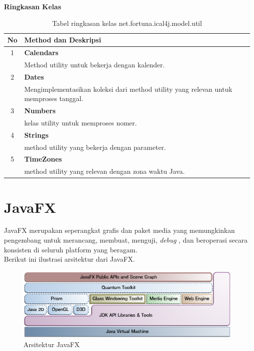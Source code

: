 	\noindent \textbf{Ringkasan Kelas}\cite{ical}
	\begin{table}[H]
		\centering
		\caption{Tabel ringkasan kelas net.fortuna.ical4j.model.util}
		\label{tab:kelas_net.fortuna.ical4j.model.util}
	\begin{tabular}{|c|p{12cm}|}
		\hline
		\textbf{No} & \textbf{Method dan Deskripsi} \\ \hline \hline
		1 & \textbf{Calendars}\\
			&	Method utility untuk bekerja dengan kalender.\\ \hline
		2 & \textbf{Dates}\\
			&	Mengimplementasikan koleksi dari method utility yang relevan untuk memproses tanggal. \\ \hline
		3 & \textbf{Numbers}\\
			&	kelas utility untuk memproses nomer. \\ \hline
		4 & \textbf{Strings}\\
			&	method utility yang bekerja dengan parameter. \\ \hline
		5 & \textbf{TimeZones}\\
			&	method utility yang relevan dengan zona waktu Java. \\ \hline
		\end{tabular}
\end{table}

\section{JavaFX}
\label{sec:JavaFX}
JavaFX merupakan seperangkat grafis dan paket media yang memungkinkan pengembang untuk merancang, membuat, menguji, \textit{debug} , dan  beroperasi secara konsisten di seluruh platform yang beragam.\cite{javafx2}\\
Berikut ini ilustrasi arsitektur dari JavaFX.
\begin{figure}[H]
	\centering
	\includegraphics[scale=0.7]{Gambar/arsitekturJavaFX}
	\caption{Arsitektur JavaFX}
	\end{figure}
	
